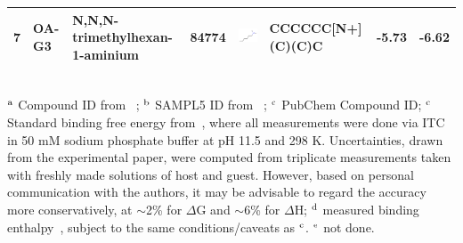 \documentclass[aps,pre,twocolumn,nofootinbib,superscriptaddress,10pt, final,tightenlines]{revtex4-1}
\begin{document}
\begin{table}
\begin{tabular}{llllp{1.5cm}>{\ttfamily}lS[table-format=-1.3, table-figures-uncertainty=1]S[table-format=-1.2, table-figures-uncertainty=1]}
7 & OA-G3    & N,N,N-trimethylhexan-1-aminium      & 84774            & \parbox[c]{1em}{\includegraphics[scale=0.15]{figures/84774.pdf}}    & CCCCCC[N+](C)(C)C                  & -5.73      & -6.62       \\ 
\bottomrule
\end{tabular}\\
$^{\rm a}$ Compound ID from ~\cite{sullivan_binding_2016}; $^{\rm b}$ SAMPL5 ID from ~\cite{yin_overview_2016}; $^{\rm c}$ PubChem Compound ID; $^{\rm c}$ Standard binding free energy from~\cite{sullivan_binding_2016}, where all measurements were done via ITC in 50 mM sodium phosphate buffer at pH 11.5 and 298 K. Uncertainties, drawn from the experimental paper, were computed from triplicate measurements taken with freshly made solutions of host and guest. However, based on personal communication with the authors, it may be advisable to regard the accuracy more conservatively, at $\sim$2\% for $\Delta$G and $\sim$6\% for $\Delta$H;  $^{\rm d}$ measured binding enthalpy~\cite{sullivan_binding_2016}, subject to the same conditions/caveats as $^{\rm c}$. $^{\rm e}$ not done.
\end{table}
\endgroup
\end{document}
